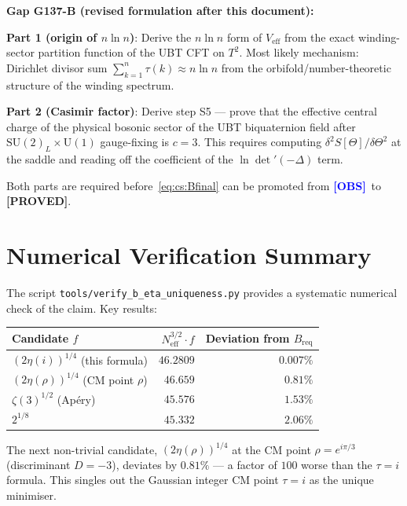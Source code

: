 \documentclass[12pt,a4paper]{article}
\theoremstyle{definition}
\theoremstyle{remark}
\newcommand{\OBS}{\textcolor{blue}{\textbf{[OBS]}}}
\newcommand{\PROVED}{\textcolor{green!60!black}{\textbf{[PROVED]}}}
\begin{document}
\begin{gapbox}
\textbf{Gap G137-B (revised formulation after this document):}

\textbf{Part 1 (origin of $n\ln n$)}: Derive the $n\ln n$ form of
$V_{\mathrm{eff}}$ from the exact winding-sector partition function of the
UBT CFT on $T^2$.  Most likely mechanism: Dirichlet divisor sum
$\sum_{k=1}^n \tau(k) \approx n\ln n$ from the orbifold/number-theoretic
structure of the winding spectrum.

\textbf{Part 2 (Casimir factor)}: Derive step S5 — prove that the effective
central charge of the physical bosonic sector of the UBT biquaternion field
after $\mathrm{SU}(2)_L \times \mathrm{U}(1)$ gauge-fixing is $c = 3$.
This requires computing $\delta^2 S[\Theta]/\delta\Theta^2$ at the
saddle and reading off the coefficient of the $\ln\det'(-\Delta)$ term.

Both parts are required before~\eqref{eq:cs:Bfinal} can be promoted from
\OBS\ to \PROVED.
\end{gapbox}

\section{Numerical Verification Summary}
\label{sec:cs:numerical}

The script \texttt{tools/verify\_b\_eta\_uniqueness.py} provides a systematic
numerical check of the claim.  Key results:

\begin{center}
\renewcommand{\arraystretch}{1.4}
\begin{tabular}{lrr}
\toprule
Candidate $f$ & $N_{\mathrm{eff}}^{3/2}\cdot f$ & Deviation from $B_{\mathrm{req}}$ \\
\midrule
$(2\eta(i))^{1/4}$ (this formula) & $46.2809$ & $0.007\%$ \\
$(2\eta(\rho))^{1/4}$ (CM point $\rho$) & $46.659$ & $0.81\%$ \\
$\zeta(3)^{1/2}$ (Apéry) & $45.576$ & $1.53\%$ \\
$2^{1/8}$ & $45.332$ & $2.06\%$ \\
\bottomrule
\end{tabular}
\end{center}

The next non-trivial candidate, $(2\eta(\rho))^{1/4}$ at the CM point
$\rho = e^{i\pi/3}$ (discriminant $D = -3$), deviates by $0.81\%$ —
a factor of $100$ worse than the $\tau=i$ formula.  This singles out
the Gaussian integer CM point $\tau = i$ as the unique minimiser.
\end{document}
